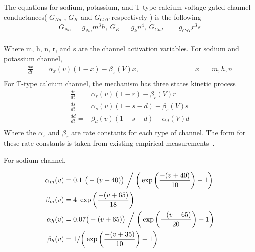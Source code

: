 The equations for sodium, potassium, and T-type calcium voltage-gated channel conductances( $G_{Na}$ , $G_{K}$ and $G_{CaT}$ respectively ) is the following
\begin{align*} 
G_{Na}\ =\bar{g}_{Na}m^{3}h ,\: G_{K}\ =\bar{g}_{k}n^{4},\: G_{CaT}&=\bar{g}_{CaT} r^{3}s\\
\end{align*}

Where m, h, n, r, and s are the channel activation variables. 
For sodium and potassium channel,
\begin{align*}
\frac{dx}{dt} =&\alpha_{x}(v)(1-x) - \beta_{x}(V)x, \hspace{8em}  x\ =\ m,h,n \\
\end{align*}
For T-type calcium channel, the mechanism has three states kinetic process
\begin{align*}
\frac{dr}{dt} =& \alpha_{r}(v)(1-r) - \beta_r(V)r \\
\frac{ds}{dt} =& \alpha_{s}(v)(1-s-d) - \beta_{s}(V)s \\
\frac{d d}{dt} =& \beta_{d}(v)(1-s-d) - \alpha_d(V)d \\
\end{align*}
Where the $\alpha_x$ and $\beta_x$ are rate constants for each type of channel. The form for these rate constants is taken from existing empirical measurements~\cite{hodgkin1952quantitative, carnevale2006neuron, wang1991model}.

For sodium channel, %

\begin{align*} 
\alpha_{m}(v) &= 0.1\  \big(-(v+40)\big)  \biggm/  \bigg( \exp \bigg( \frac{-(v+40)}{10} \bigg) - 1 \bigg)\\
\beta_{m}(v) &= 4\ \exp \bigg(\frac{-(v+65)}{18}\bigg)\\
\alpha_{h}(v) &= 0.07\big(-(v+65)\big)  \biggm/  \bigg( \exp \bigg( \frac{-(v+65)}{20} \bigg) - 1 \bigg)\\
\beta_{h}(v) &= 1 / \bigg( \exp \bigg(\frac{-(v+35)}{10}\bigg) + 1 \bigg)\\
\end{align*}

